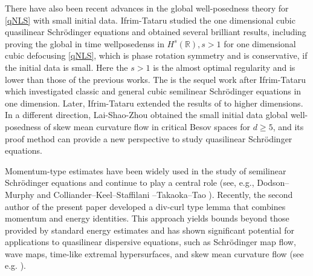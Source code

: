 \documentclass[10pt,twoside,a4paper]{article}
\numberwithin{equation}{section}\allowdisplaybreaks
\def\geq{\geqslant}
\begin{document}
There have also been recent advances in  the global well-posedness theory for \eqref{qNLS} with small initial data.
Ifrim-Tataru \cite{ifrim2025global} studied the one dimensional cubic quasilinear Schr\"odinger equations and obtained several  brilliant results, including proving the global in time wellposedenss in $ H^s (\mathbb{R}), s>1 $  for  one dimensional cubic defocusing \eqref{qNLS}, which is phase rotation symmetry and is
conservative, if the initial data is small. Here the  $ s>1 $  is the almost optimal regularity and  is lower than those of the previous works. 
The \cite{ifrim2025global} is the sequel work after Ifrim-Tataru \cite{ifrim2023global,ifrim2024long} which 
investigated  classic   and  general   cubic semilinear Schr\"odinger equations  in one dimension. Later, Ifrim-Tataru \cite{ifrim-Tataru} extended the results of  \cite{ifrim2025global} to higher dimensions. 
 In a different direction, Lai-Shao-Zhou \cite{lai2025global} obtained the small initial data global well-posedness of skew mean curvature flow in critical Besov spaces for $ d\geq 5 $, and its proof method can provide a new perspective to study quasilinear Schr\"odinger equations.

Momentum-type estimates have been widely used in the study of semilinear Schrödinger equations and continue to play a central role (see, e.g., Dodson–Murphy \cite{Dodson} and Colliander–Keel–Staffilani –Takaoka–Tao \cite{Tao}). Recently, the second author  of the present paper developed a div-curl type lemma that combines momentum and energy identities. This approach yields bounds beyond those provided by standard energy estimates and has shown significant potential for applications to quasilinear dispersive equations, such as Schrödinger map flow, wave maps, time-like extremal hypersurfaces, and skew mean curvature flow (see e.g. \cite{lai2025global,LZ24,wang2212global,WZ3,wang2023proof,zhou20221+}).
\end{document}
